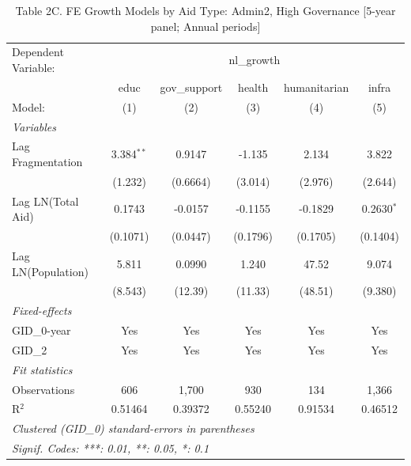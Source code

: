 
\begin{table}[H]
   \caption{Table 2C. FE Growth Models by Aid Type: Admin2, High Governance [5-year panel; Annual periods]}
   \centering
   \begin{tabular}{lccccc}
      \tabularnewline \midrule \midrule
      Dependent Variable: & \multicolumn{5}{c}{nl\_growth}\\
                         & educ         & gov\_support  & health   & humanitarian & infra \\   
      Model:             & (1)          & (2)           & (3)      & (4)          & (5)\\  
      \midrule
      \emph{Variables}\\
      Lag Fragmentation  & 3.384$^{**}$ & 0.9147        & -1.135   & 2.134        & 3.822\\   
                         & (1.232)      & (0.6664)      & (3.014)  & (2.976)      & (2.644)\\   
      Lag LN(Total Aid)  & 0.1743       & -0.0157       & -0.1155  & -0.1829      & 0.2630$^{*}$\\   
                         & (0.1071)     & (0.0447)      & (0.1796) & (0.1705)     & (0.1404)\\   
      Lag LN(Population) & 5.811        & 0.0990        & 1.240    & 47.52        & 9.074\\   
                         & (8.543)      & (12.39)       & (11.33)  & (48.51)      & (9.380)\\   
      \midrule
      \emph{Fixed-effects}\\
      GID\_0-year        & Yes          & Yes           & Yes      & Yes          & Yes\\  
      GID\_2             & Yes          & Yes           & Yes      & Yes          & Yes\\  
      \midrule
      \emph{Fit statistics}\\
      Observations       & 606          & 1,700         & 930      & 134          & 1,366\\  
      R$^2$              & 0.51464      & 0.39372       & 0.55240  & 0.91534      & 0.46512\\  
      \midrule \midrule
      \multicolumn{6}{l}{\emph{Clustered (GID\_0) standard-errors in parentheses}}\\
      \multicolumn{6}{l}{\emph{Signif. Codes: ***: 0.01, **: 0.05, *: 0.1}}\\
   \end{tabular}
\end{table}


